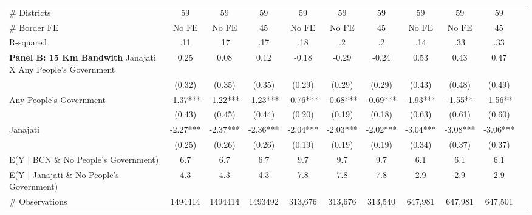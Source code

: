 \begin{tabular}{l*{10}{c}}
\# Districts        &          59   &          59   &          59   &          59   &          59   &          59   &          59   &          59   &          59   \\
\# Border FE        &       No FE   &       No FE   &          45   &       No FE   &       No FE   &          45   &       No FE   &       No FE   &          45   \\
R-squared           &         .11   &         .17   &         .17   &         .18   &          .2   &          .2   &         .14   &         .33   &         .33   \\
\midrule
\textbf{Panel B: 15 Km Bandwith}
\midrule
Janajati X Any People's Government&        0.25   &        0.08   &        0.12   &       -0.18   &       -0.29   &       -0.24   &        0.53   &        0.43   &        0.47   \\
                    &      (0.32)   &      (0.35)   &      (0.35)   &      (0.29)   &      (0.29)   &      (0.29)   &      (0.43)   &      (0.48)   &      (0.49)   \\
Any People's Government&       -1.37***&       -1.22***&       -1.23***&       -0.76***&       -0.68***&       -0.69***&       -1.93***&       -1.55** &       -1.56** \\
                    &      (0.43)   &      (0.45)   &      (0.44)   &      (0.20)   &      (0.19)   &      (0.18)   &      (0.63)   &      (0.61)   &      (0.60)   \\
Janajati            &       -2.27***&       -2.37***&       -2.36***&       -2.04***&       -2.03***&       -2.02***&       -3.04***&       -3.08***&       -3.06***\\
                    &      (0.25)   &      (0.26)   &      (0.26)   &      (0.19)   &      (0.19)   &      (0.19)   &      (0.34)   &      (0.37)   &      (0.37)   \\
\midrule
E(Y $|$ BCN \& No People's Government)&         6.7   &         6.7   &         6.7   &         9.7   &         9.7   &         9.7   &         6.1   &         6.1   &         6.1   \\
E(Y $|$ Janajati \& No People's Government)&         4.3   &         4.3   &         4.3   &         7.8   &         7.8   &         7.8   &         2.9   &         2.9   &         2.9   \\
\# Observations     &     1494414   &     1494414   &     1493492   &     313,676   &     313,676   &     313,540   &     647,981   &     647,981   &     647,501   \\

\end{tabular}
